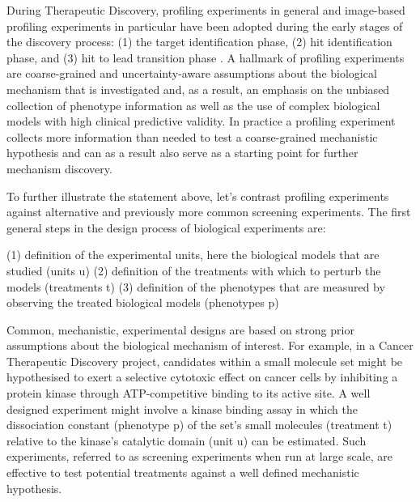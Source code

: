 \begin{flushleft}
During Therapeutic Discovery, profiling experiments in general and image-based profiling experiments in particular have been adopted during the early stages of the discovery process: (1) the target identification phase, (2) hit identification phase, and (3) hit to lead transition phase \cite{chandrasekaranImagebasedProfilingDrug2021}. A hallmark of profiling experiments are coarse-grained and uncertainty-aware assumptions about the biological mechanism that is investigated and, as a result, an emphasis on the unbiased collection of phenotype information as well as the use of complex biological models with high clinical predictive validity. In practice a profiling experiment collects more information than needed to test a coarse-grained mechanistic hypothesis and can as a result also serve as a starting point for further mechanism discovery. 

To further illustrate the statement above, let's contrast profiling experiments against alternative and previously more common screening experiments. The first general steps in the design process of biological experiments are:

(1) definition of the experimental units, here the biological models that are studied (units u)
(2) definition of the treatments with which to perturb the models (treatments t)
(3) definition of the phenotypes that are measured by observing the treated biological models (phenotypes p)

Common, mechanistic, experimental designs are based on strong prior assumptions about the biological mechanism of interest. For example, in a Cancer Therapeutic Discovery project, candidates within a small molecule set might be hypothesised to exert a selective cytotoxic effect on cancer cells by inhibiting a protein kinase through ATP-competitive binding to its active site. A well designed experiment might involve a kinase binding assay in which the dissociation constant (phenotype p) of the set's small molecules (treatment t) relative to the kinase's catalytic domain (unit u) can be estimated. Such experiments, referred to as screening experiments when run at large scale, are effective to test potential treatments against a well defined mechanistic hypothesis. 


\end{flushleft}
